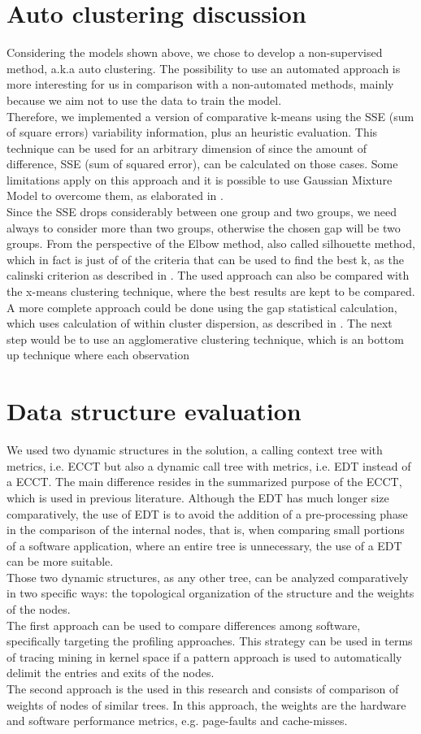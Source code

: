 \section{Auto clustering discussion}
Considering the models shown above, we chose to develop a non-supervised method, a.k.a auto clustering. The possibility to use an automated approach is more interesting for us in comparison with a non-automated methods, mainly because we aim not to use the data to train the model. \\
Therefore, we implemented a version of comparative k-means using the SSE (sum of square errors) variability information, plus an heuristic evaluation. This technique can be used for an arbitrary dimension of since the amount of difference, SSE (sum of squared error), can be calculated on those cases.  Some limitations apply on this approach and it is possible to use Gaussian Mixture Model to overcome them, as elaborated in \cite{gaussian}.\\
Since the SSE drops considerably between one group and two groups, we need always to consider more than two groups, otherwise the chosen gap will be two groups.
From the perspective of the Elbow method, also called silhouette method, which in fact is just of of the criteria that can be used to find the best k, as the calinski criterion as described in \cite{calinski}. The used approach can also be compared with the x-means clustering technique, where the best results are kept to be compared.
A more complete approach could be done using the gap statistical calculation, which uses calculation of within cluster dispersion, as described in \cite{gap_statistical}.
The next step would be to use an agglomerative clustering technique, which is an bottom up technique where each observation 
\section{Data structure evaluation}
We used two dynamic structures in the solution, a calling context tree with metrics, i.e. ECCT but also a dynamic call tree with metrics, i.e. EDT instead of a ECCT. 
The main difference resides in the summarized purpose of the ECCT, which is used in previous literature. Although the EDT has much longer size comparatively, the use of EDT is to avoid the addition of a pre-processing phase in the comparison of the internal nodes, that is, when comparing small portions of a software application, where an entire tree is unnecessary, the use of a EDT can be more suitable.\\
Those two dynamic structures, as any other tree, can be analyzed comparatively in two specific ways: the topological organization of the structure and the weights of the nodes. \\
The first approach can be used to compare differences among software, specifically targeting the profiling approaches. This strategy can be used in terms of tracing mining in kernel space if a pattern approach is used to automatically delimit the entries and exits of the nodes.\\
The second approach is the used in this research and consists of comparison of weights of nodes of similar trees. In this approach, the weights are the hardware and software performance metrics, e.g. page-faults and cache-misses.
